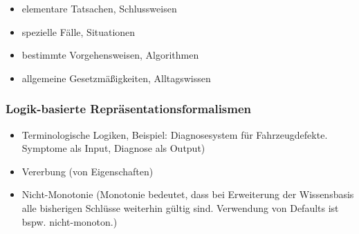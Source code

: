 \documentclass[runningheads,deutsch]{llncs}
\begin{document}
\begin{itemize}
    \item elementare Tatsachen, Schlussweisen
    \item spezielle Fälle, Situationen
    \item bestimmte Vorgehensweisen, Algorithmen
    \item allgemeine Gesetzmäßigkeiten, Alltagswissen
\end{itemize}

\subsubsection{Logik-basierte Repräsentationsformalismen}
\begin{itemize}
    \item Terminologische Logiken, Beispiel: Diagnosesystem für Fahrzeugdefekte. Symptome als Input, Diagnose als Output)
    \item Vererbung (von Eigenschaften)
    \item Nicht-Monotonie (Monotonie bedeutet, dass bei Erweiterung der Wissensbasis alle bisherigen Schlüsse weiterhin gültig sind. Verwendung von Defaults ist bspw. nicht-monoton.)
\end{itemize}


\end{document}
